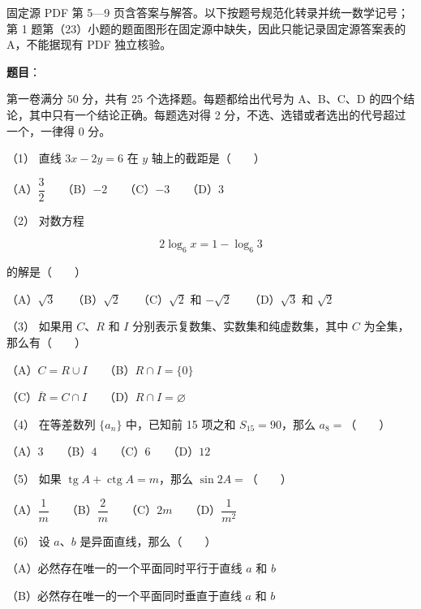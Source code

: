

\begin{gktip}
固定源 PDF 第 5—9 页含答案与解答。以下按题号规范化转录并统一数学记号；第 1 题第（23）小题的题面图形在固定源中缺失，因此只能记录固定源答案表的 A，不能据现有 PDF 独立核验。
\end{gktip}

\begin{answer}

\textbf{题目}：

第一卷满分 50 分，共有 25 个选择题。每题都给出代号为 A、B、C、D 的四个结论，其中只有一个结论正确。每题选对得 2 分，不选、选错或者选出的代号超过一个，一律得 0 分。

（1） 直线 $3x-2y=6$ 在 $y$ 轴上的截距是\mbox{（　　）}

（A）$\dfrac32$　　（B）$-2$　　（C）$-3$　　（D）$3$

（2） 对数方程

\nopagebreak[4]
\[
2\log_6x=1-\log_6 3
\]

的解是\mbox{（　　）}

（A）$\sqrt3$　　（B）$\sqrt2$　　（C）$\sqrt2$ 和 $-\sqrt2$　　（D）$\sqrt3$ 和 $\sqrt2$

（3） 如果用 $C\text{、}R$ 和 $I$ 分别表示复数集、实数集和纯虚数集，其中 $C$ 为全集，那么有\mbox{（　　）}

（A）$C=R\cup I$　　（B）$R\cap I=\{0\}$

（C）$\overline R=C\cap I$　　（D）$R\cap I=\varnothing$

（4） 在等差数列 $\{a_n\}$ 中，已知前 15 项之和 $S_{15}=90$，那么 $a_8=$\mbox{（　　）}

（A）$3$　　（B）$4$　　（C）$6$　　（D）$12$

（5） 如果 $\operatorname{tg}A+\operatorname{ctg}A=m$，那么 $\sin2A=$\mbox{（　　）}

（A）$\dfrac1m$　　（B）$\dfrac2m$　　（C）$2m$　　（D）$\dfrac1{m^2}$

（6） 设 $a\text{、}b$ 是异面直线，那么\mbox{（　　）}

（A）必然存在唯一的一个平面同时平行于直线 $a$ 和 $b$

（B）必然存在唯一的一个平面同时垂直于直线 $a$ 和 $b$


\end{answer}
